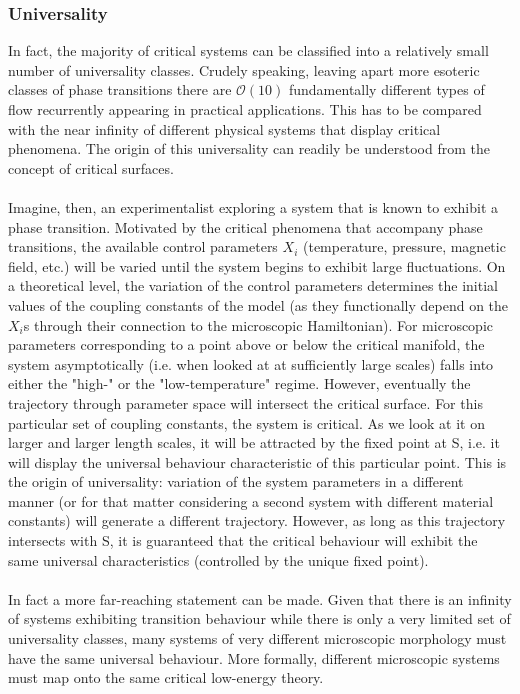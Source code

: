 \documentclass[cyan]{elegantnote}
\begin{document}
\subsubsection{Universality}
In fact, the majority of critical systems can be classified into a relatively small number of universality classes. Crudely speaking, leaving apart more esoteric classes of phase transitions there are $\mathcal{O}(10)$ fundamentally different types of flow recurrently appearing in practical applications. This has to be compared with the near infinity of different physical systems that display critical phenomena. The origin of this universality can readily be understood from the concept of critical surfaces.
\\ \\
Imagine, then, an experimentalist exploring a system that is known to exhibit a phase transition. Motivated by the critical phenomena that accompany phase transitions, the available control parameters $X_i$ (temperature, pressure, magnetic field, etc.) will be varied until the system begins to exhibit large fluctuations. On a theoretical level, the variation of the control parameters determines the initial values of the coupling constants of the model (as they functionally depend on the $X_i$s through their connection to the microscopic Hamiltonian). For microscopic parameters corresponding to a point above or below the critical manifold, the system asymptotically (i.e. when looked at at sufficiently large scales) falls into either the "high-" or the "low-temperature" regime. 
However, eventually the trajectory through parameter space will intersect the critical surface. For this particular set of coupling constants, the system is critical. As we look at it on larger and larger length scales, it will be attracted by the fixed point at S, i.e. it will display the universal behaviour characteristic of this particular point. 
This is the origin of universality: variation of the system parameters in a different manner (or for that matter considering a second system with different material constants) will generate a different trajectory. 
However, as long as this trajectory intersects with S, it is guaranteed that the critical behaviour will exhibit the same universal characteristics (controlled by the unique fixed point).
\\ \\
In fact a more far-reaching statement can be made. Given that there is an infinity of systems exhibiting transition behaviour while there is only a very limited set of universality classes, many systems of very different microscopic morphology must have the same universal behaviour. More formally, different microscopic systems must map onto the same critical low-energy theory.
\end{document}

